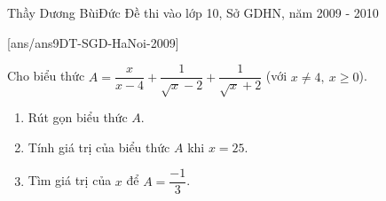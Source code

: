 \begin{name}
{Thầy Dương BùiĐức}
{Đề thi vào lớp 10, Sở GDHN, năm 2009 - 2010}
\end{name}
	\setcounter{ex}{0}
[ans/ans9DT-SGD-HaNoi-2009]
\begin{ex}[9D1B8][9D1B8][9D1B8]
Cho biểu thức $A=\dfrac{x}{x-4}+\dfrac{1}{\sqrt{x}-2}+\dfrac{1}{\sqrt{x}+2}$ (với $x\ne 4,\ x\ge 0$).
\begin{enumerate}
	\item 	Rút gọn biểu thức $A$.
	\item	Tính giá trị của biểu thức $A$ khi $x=25$. 
	\item 	Tìm giá trị của $x$ để $A=\dfrac{-1}{3}$.
\end{enumerate}
\end{ex} 
 
